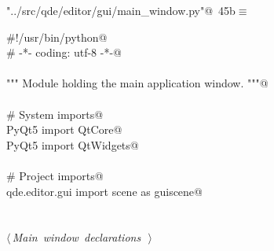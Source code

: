 \documentclass[
    a4paper,      %
    10pt,         %
    openright,    %
    notitlepage,  %
    parskip=half, %
]{scrreprt}       %
\theoremstyle{definition}                    %
\begin{document}
\begin{flushleft} \small
\begin{minipage}{\linewidth}\label{scrap52}\raggedright\small
{} \verb@"../src/qde/editor/gui/main_window.py"@\nobreak\ {\footnotesize {45b}}$\equiv$
\vspace{-1ex}
\begin{list}{}{} \item
\mbox{}\lstinline@#!/usr/bin/python@\\
\mbox{}\lstinline@# -*- coding: utf-8 -*-@\\
\mbox{}\lstinline@@\\
\mbox{}\lstinline@""" Module holding the main application window. """@\\
\mbox{}\lstinline@@\\
\mbox{}\lstinline@# System imports@\\
\mbox{}\lstinline@from PyQt5 import QtCore@\\
\mbox{}\lstinline@from PyQt5 import QtWidgets@\\
\mbox{}\lstinline@@\\
\mbox{}\lstinline@# Project imports@\\
\mbox{}\lstinline@from qde.editor.gui import scene as guiscene@\\
\mbox{}\lstinline@@\\
\mbox{}\lstinline@@\\
\mbox{}\lstinline@@\hbox{$\langle\,${\itshape Main window declarations}\nobreak\ {\footnotesize {}}$\,\rangle$}\lstinline@@\\
\mbox{}\lstinline@@{\NWsep}
\end{list}
\vspace{-1.5ex}
\footnotesize
\begin{list}{}{\setlength{\itemsep}{-\parsep}\setlength{\itemindent}{-\leftmargin}}

\item{}
\end{list}
\end{minipage}\vspace{4ex}
\end{flushleft}
\end{document}

